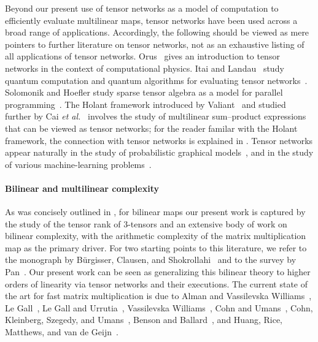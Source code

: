 \documentclass{toc}
\begin{document}
Beyond our present use of tensor networks as a model of computation to efficiently evaluate multilinear maps, tensor networks 
%
have been  %
used across a broad range of applications. Accordingly, the following should be viewed as mere pointers to further literature on tensor networks, not as an exhaustive listing of all applications of tensor networks. Orus~\cite{Orus2014} gives an introduction to tensor networks in the context of computational physics. Itai and Landau~\cite{ItaiL2010} study quantum computation and quantum algorithms for evaluating tensor networks~\cite{ItaiL2010}. Solomonik and Hoefler study sparse tensor algebra as a model for parallel programming~\cite{SolomonikH2015}. The Holant framework
introduced by Valiant~\cite{Valiant2008} and studied further by
Cai \emph{et al.}~\cite{CaiLX2011,CaiGW2016a} involves the study of multilinear
sum--product expressions that can be viewed as tensor networks; for the reader familar with the Holant framework, the connection with tensor networks is explained in .
Tensor networks appear naturally in the study of probabilistic graphical
models~\cite{KollerF2009,MoitraW2018,RobevaS2017,WainwrightJ2008},
and in the study of various machine-learning
problems~\cite{CichockiLOPZM2016,CichockiPZLOSM2017}.

\paragraph*{Bilinear and multilinear complexity}

As was concisely outlined in , for bilinear maps our present work %
%
%
is captured by
%
the study of
the  %
tensor rank of 3-tensors and an extensive body of work on bilinear complexity, with the arithmetic complexity of the matrix multiplication map as the primary driver. For two starting points to this literature, we refer to the monograph by B\"urgisser, Clausen, and Shokrollahi~\cite{Buergisser1997} and to the survey by Pan~\cite{Pan2014}. Our present work can be seen as generalizing this bilinear theory to higher orders of linearity via tensor networks and their executions. The current state of the art for fast matrix multiplication is due to Alman and Vassilevska Williams~\cite{AlmanVW2021}, Le Gall~\cite{LeGall2012,LeGall2014}, Le Gall and Urrutia~\cite{LeGallU2017}, Vassilevska Williams~\cite{VassilevskaWilliams2012}, Cohn and Umans~\cite{CohnU2013}, Cohn, Kleinberg, Szegedy, and Umans~\cite{Cohn2005}, Benson and Ballard~\cite{BensonB2015}, and Huang, Rice, Matthews, and van de Geijn~\cite{HuangRMG2017}.
\end{document}
